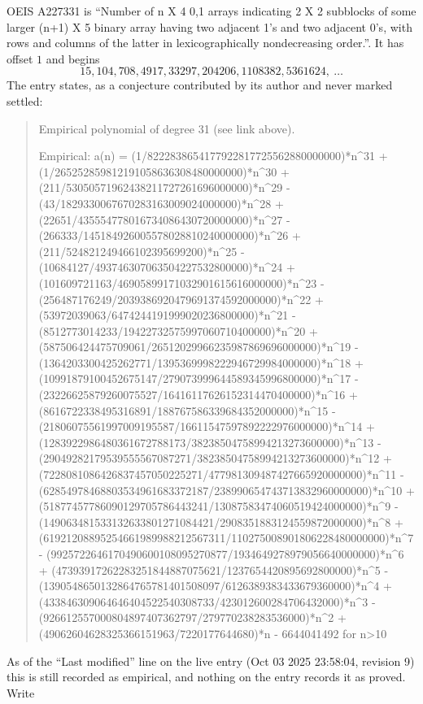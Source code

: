 \documentclass[11pt,a4paper]{article}
\theoremstyle{plain}
\theoremstyle{definition}
\begin{document}
OEIS A227331 is ``Number of n X 4 0,1 arrays indicating 2 X 2 subblocks of some larger (n+1) X 5 binary array having two adjacent 1's and two adjacent 0's, with rows and columns of the latter in lexicographically nondecreasing order.''. It has offset $1$ and begins
\[
15, 104, 708, 4917, 33297, 204206, 1108382, 5361624,\ \dots
\]
The entry states, as a conjecture contributed by its author and never marked settled:
\begin{quote}
Empirical polynomial of degree 31 (see link above).

Empirical: a(n) = (1/8222838654177922817725562880000000)*n\^{}31 + (1/265252859812191058636308480000000)*n\^{}30 + (211/53050571962438211727261696000000)*n\^{}29 - (43/1829330067670283163009024000000)*n\^{}28 + (22651/435554778016734086430720000000)*n\^{}27 - (266333/145184926005578028810240000000)*n\^{}26 + (211/524821249466102395699200)*n\^{}25 - (10684127/493746307063504227532800000)*n\^{}24 + (101609721163/46905899171032901615616000000)*n\^{}23 - (256487176249/2039386920479691374592000000)*n\^{}22 + (53972039063/6474244191999020236800000)*n\^{}21 - (8512773014233/19422732575997060710400000)*n\^{}20 + (587506424475709061/26512029966235987869696000000)*n\^{}19 - (1364203300425262771/1395369998222946729984000000)*n\^{}18 + (10991879100452675147/279073999644589345996800000)*n\^{}17 - (23226625879260075527/16416117626152314470400000)*n\^{}16 + (8616722338495316891/188767586339684352000000)*n\^{}15 - (21806075561997009195587/16611547597892222976000000)*n\^{}14 + (1283922986480361672788173/38238504758994213273600000)*n\^{}13 - (29049282179539555567087271/38238504758994213273600000)*n\^{}12 + (7228081086426837457050225271/477981309487427665920000000)*n\^{}11 - (62854978468803534961683372187/238990654743713832960000000)*n\^{}10 + (51877457786090129705786443241/13087583474060519424000000)*n\^{}9 - (149063481533132633801271084421/2908351883124559872000000)*n\^{}8 + (61921208895254661989988212567311/110275008901806228480000000)*n\^{}7 - (9925722646170490600108095270877/1934649278979056640000000)*n\^{}6 + (47393917262283251844887075621/1237654420895692800000)*n\^{}5 - (1390548650132864765781401508097/6126389383433679360000)*n\^{}4 + (433846309064646404522540308733/423012600284706432000)*n\^{}3 - (926612557000804897407362797/279770238283536000)*n\^{}2 + (49062604628325366151963/7220177644680)*n - 6644041492 for n>10
\end{quote}
As of the ``Last modified'' line on the live entry (Oct 03 2025 23:58:04, revision 9) this is still
recorded as empirical, and nothing on the entry records it as proved. Write
\end{document}
